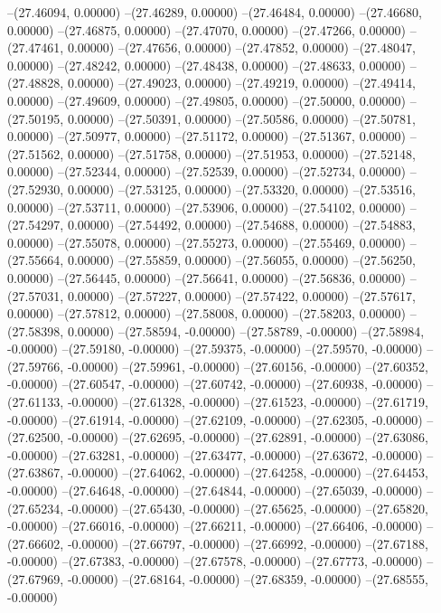 --(27.46094, 0.00000)
--(27.46289, 0.00000)
--(27.46484, 0.00000)
--(27.46680, 0.00000)
--(27.46875, 0.00000)
--(27.47070, 0.00000)
--(27.47266, 0.00000)
--(27.47461, 0.00000)
--(27.47656, 0.00000)
--(27.47852, 0.00000)
--(27.48047, 0.00000)
--(27.48242, 0.00000)
--(27.48438, 0.00000)
--(27.48633, 0.00000)
--(27.48828, 0.00000)
--(27.49023, 0.00000)
--(27.49219, 0.00000)
--(27.49414, 0.00000)
--(27.49609, 0.00000)
--(27.49805, 0.00000)
--(27.50000, 0.00000)
--(27.50195, 0.00000)
--(27.50391, 0.00000)
--(27.50586, 0.00000)
--(27.50781, 0.00000)
--(27.50977, 0.00000)
--(27.51172, 0.00000)
--(27.51367, 0.00000)
--(27.51562, 0.00000)
--(27.51758, 0.00000)
--(27.51953, 0.00000)
--(27.52148, 0.00000)
--(27.52344, 0.00000)
--(27.52539, 0.00000)
--(27.52734, 0.00000)
--(27.52930, 0.00000)
--(27.53125, 0.00000)
--(27.53320, 0.00000)
--(27.53516, 0.00000)
--(27.53711, 0.00000)
--(27.53906, 0.00000)
--(27.54102, 0.00000)
--(27.54297, 0.00000)
--(27.54492, 0.00000)
--(27.54688, 0.00000)
--(27.54883, 0.00000)
--(27.55078, 0.00000)
--(27.55273, 0.00000)
--(27.55469, 0.00000)
--(27.55664, 0.00000)
--(27.55859, 0.00000)
--(27.56055, 0.00000)
--(27.56250, 0.00000)
--(27.56445, 0.00000)
--(27.56641, 0.00000)
--(27.56836, 0.00000)
--(27.57031, 0.00000)
--(27.57227, 0.00000)
--(27.57422, 0.00000)
--(27.57617, 0.00000)
--(27.57812, 0.00000)
--(27.58008, 0.00000)
--(27.58203, 0.00000)
--(27.58398, 0.00000)
--(27.58594, -0.00000)
--(27.58789, -0.00000)
--(27.58984, -0.00000)
--(27.59180, -0.00000)
--(27.59375, -0.00000)
--(27.59570, -0.00000)
--(27.59766, -0.00000)
--(27.59961, -0.00000)
--(27.60156, -0.00000)
--(27.60352, -0.00000)
--(27.60547, -0.00000)
--(27.60742, -0.00000)
--(27.60938, -0.00000)
--(27.61133, -0.00000)
--(27.61328, -0.00000)
--(27.61523, -0.00000)
--(27.61719, -0.00000)
--(27.61914, -0.00000)
--(27.62109, -0.00000)
--(27.62305, -0.00000)
--(27.62500, -0.00000)
--(27.62695, -0.00000)
--(27.62891, -0.00000)
--(27.63086, -0.00000)
--(27.63281, -0.00000)
--(27.63477, -0.00000)
--(27.63672, -0.00000)
--(27.63867, -0.00000)
--(27.64062, -0.00000)
--(27.64258, -0.00000)
--(27.64453, -0.00000)
--(27.64648, -0.00000)
--(27.64844, -0.00000)
--(27.65039, -0.00000)
--(27.65234, -0.00000)
--(27.65430, -0.00000)
--(27.65625, -0.00000)
--(27.65820, -0.00000)
--(27.66016, -0.00000)
--(27.66211, -0.00000)
--(27.66406, -0.00000)
--(27.66602, -0.00000)
--(27.66797, -0.00000)
--(27.66992, -0.00000)
--(27.67188, -0.00000)
--(27.67383, -0.00000)
--(27.67578, -0.00000)
--(27.67773, -0.00000)
--(27.67969, -0.00000)
--(27.68164, -0.00000)
--(27.68359, -0.00000)
--(27.68555, -0.00000)
